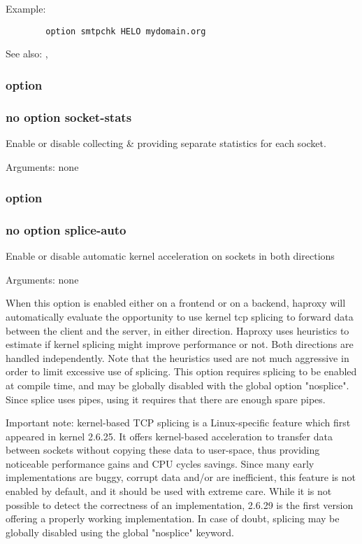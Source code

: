 {  Example:
\begin{verbatim}
        option smtpchk HELO mydomain.org
\end{verbatim}

  See also: , 

\subsubsection[socket-stats]{option }
\subsubsection*{no option socket-stats}


  Enable or disable collecting \& providing separate statistics for each socket.


  Arguments: none

\subsubsection[splice-auto]{option }
\subsubsection*{no option splice-auto}


  Enable or disable automatic kernel acceleration on sockets in both directions
  

  Arguments: none

  When this option is enabled either on a frontend or on a backend, haproxy
  will automatically evaluate the opportunity to use kernel tcp splicing to
  forward data between the client and the server, in either direction. Haproxy
  uses heuristics to estimate if kernel splicing might improve performance or
  not. Both directions are handled independently. Note that the heuristics used
  are not much aggressive in order to limit excessive use of splicing. This
  option requires splicing to be enabled at compile time, and may be globally
  disabled with the global option "nosplice". Since splice uses pipes, using it
  requires that there are enough spare pipes.

  Important note: kernel-based TCP splicing is a Linux-specific feature which
  first appeared in kernel 2.6.25. It offers kernel-based acceleration to
  transfer data between sockets without copying these data to user-space, thus
  providing noticeable performance gains and CPU cycles savings. Since many
  early implementations are buggy, corrupt data and/or are inefficient, this
  feature is not enabled by default, and it should be used with extreme care.
  While it is not possible to detect the correctness of an implementation,
  2.6.29 is the first version offering a properly working implementation. In
  case of doubt, splicing may be globally disabled using the global "nosplice"
  keyword.

}
